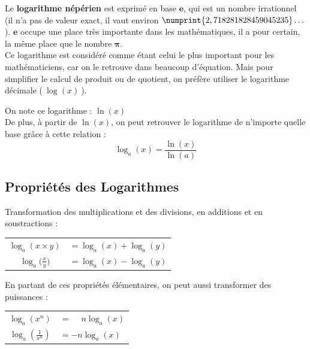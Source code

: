 \documentclass[a4paper]{article}
\begin{document}
	Le \textbf{logarithme népérien} est exprimé en base $\mathbf{e}$, qui est un nombre irrationnel (il n'a pas de valeur exact, il vaut environ $\numprint{2,718281828459045235}\dots$). $\mathbf{e}$ occupe une place très importante dans les mathématiques, il a pour certain, la même place que le nombre $\mathbf{\pi}$.\\
	
	Ce logarithme est considéré comme étant celui le plus important pour les mathématiciens, car on le retrouve dans beaucoup d'équation. Mais pour simplifier le calcul de produit ou de quotient, on préfère utiliser le logarithme décimale ($~\log (x)~$).
	
	On note ce logarithme : {\large $ \ln (x) $}\\
	
	De plus, à partir de $ \ln (x) $, on peut retrouver le logarithme de n'importe quelle base grâce à cette relation : $$ \log_a (x) = \frac{\ln (x)}{\ln (a)} $$

\pagebreak

\subsection{Propriétés des Logarithmes}

Transformation des multiplications et des divisions, en additions et en soustractions :

\begin{center}
\begin{LARGE}
\begin{tabular}{cl}

	$ \log_a ( x \times y )         $ & $= \log_a (x) + \log_a (y) $ \\
	\vspace{0.3cm}
	$ \log_a \Big( \frac{x}{y} \Big)$ & $= \log_a (x) - \log_a (y) $ \\
	
\end{tabular}
\end{LARGE}
\end{center}



En partant de ces propriétés élémentaires, on peut aussi transformer des puissances :

\begin{center}
\begin{LARGE}
\begin{tabular}{cl}

	$ \log_a ( x^n )                       $ & $= \phantom{-}n \log_a (x) $ \\
	\vspace{0.3cm}
	$ \log_a \left( \frac{1}{x^{n}} \right)$ & $= - n \log_a (x) $ \\
	
\end{tabular}
\end{LARGE}
\end{center}
\end{document}
